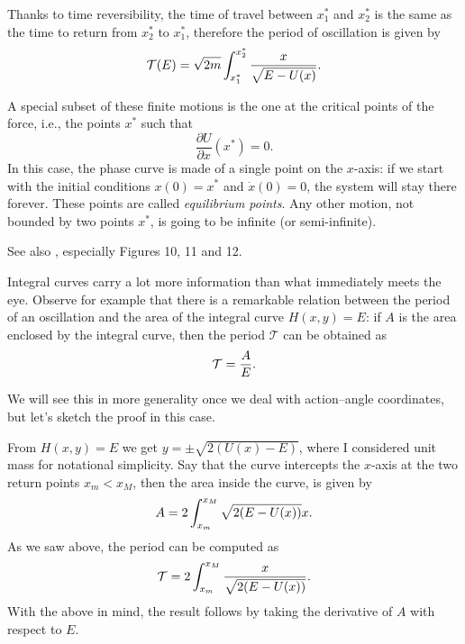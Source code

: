 \documentclass[english,fontsize=11pt,paper=a5,oneside]{scrbook}
\newcommand{\cT}{\mathcal{T}}
\let\d\relax
\newcommand{\d}{\mathrm{d}}
\theoremstyle{definition}
\newenvironment{remark}
  {\pushQED{\qed}\renewcommand{\qedsymbol}{$\lozenge$}\remarkx}
  {\popQED\endremarkx}
\begin{document}
Thanks to time reversibility, the time of travel between $x_1^*$ and $x_2^*$ is the same as the time to return from $x_2^*$ to $x_1^*$, therefore the period of oscillation is given by
\begin{equation}\label{eq:osc}
  \cT(E) = \sqrt{2m} \int_{x^*_1}^{x^*_2} \frac{\d x}{\sqrt{E-U(x)}}.
\end{equation}

A special subset of these finite motions is the one at the critical points of the force, i.e., the points $x^*$ such that
\begin{equation}
  \frac{\partial U}{\partial x}(x^*) = 0.
\end{equation}
In this case, the phase curve is made of a single point on the $x$-axis: if we start with the initial conditions $x(0) = x^*$ and $\dot x(0) = 0$, the system will stay there forever. These points are called \emph{equilibrium points}.
%
Any other motion, not bounded by two points $x^*$, is going to be infinite (or semi-infinite).

See also \cite[Chapter 2.4]{book:arnold}, especially Figures 10, 11 and 12.

\begin{remark}
  Integral curves carry a lot more information than what immediately meets the eye.
  Observe for example that there is a remarkable relation between the period of an oscillation and the area of the integral curve $H(x,y) = E$:
  if $A$ is the area enclosed by the integral curve, then the period $\cT$ can be obtained as
  \begin{equation}
    \cT = \frac{\d A}{\d E}.
  \end{equation}

  We will see this in more generality once we deal with action--angle coordinates, but let's sketch the proof in this case.

  From $H(x,y) = E$ we get $y = \pm \sqrt{2(U(x) - E)}$, where I considered unit mass for notational simplicity. Say that the curve intercepts the $x$-axis at the two return points $x_m < x_M$, then the area inside the curve, is given by
  \begin{equation}
    A = 2\int_{x_m}^{x_M}\sqrt{2(E - U(x))} \d x.
  \end{equation}
  As we saw above, the period can be computed as
  \begin{equation}
    \cT = 2\int_{x_m}^{x_M} \frac{\d x}{\sqrt{2(E - U(x))}}.
  \end{equation}
  With the above in mind, the result follows by taking the derivative of $A$ with respect to $E$.
\end{remark}
\end{document}
